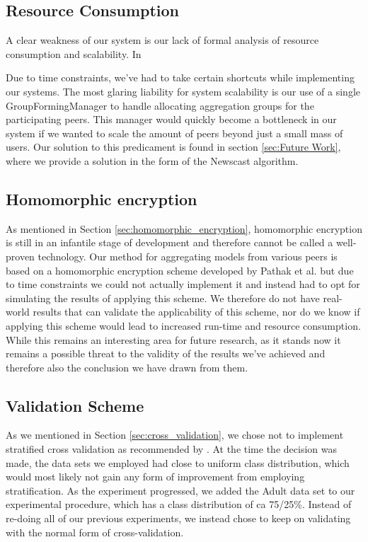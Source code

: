 \subsection{Resource Consumption}
A clear weakness of our system is our lack of formal analysis of resource consumption and scalability. In 

Due to time constraints, we've had to take certain shortcuts while implementing our systems. The most glaring liability for system scalability is our use of a single GroupFormingManager to handle allocating aggregation groups for the participating peers. This manager would quickly become a bottleneck in our system if we wanted to scale the amount of peers beyond just a small mass of users. Our solution to this predicament is found in section \ref{sec:Future Work}, where we provide a solution in the form of the Newscast algorithm. 

\subsection{Homomorphic encryption}
As mentioned in Section \ref{sec:homomorphic_encryption}, homomorphic encryption is still in an infantile stage of development and therefore cannot be called a well-proven technology. Our method for aggregating models from various peers is based on a homomorphic encryption scheme developed by Pathak et al. but due to time constraints we could not actually implement it and instead had to opt for simulating the results of applying this scheme. We therefore do not have real-world results that can validate the applicability of this scheme, nor do we know if applying this scheme would lead to increased run-time and resource consumption. While this remains an interesting area for future research, as it stands now it remains a possible threat to the validity of the results we've achieved and therefore also the conclusion we have drawn from them.  

\subsection{Validation Scheme}
As we mentioned in Section \ref{sec:cross_validation}, we chose not to implement stratified cross validation as recommended by \cite{kohavi1995crossvalidation}. At the time the decision was made, the data sets we employed had close to uniform class distribution, which would most likely not gain any form of improvement from employing stratification. As the experiment progressed, we added the Adult data set to our experimental procedure, which has a class distribution of ca 75/25\%. Instead of re-doing all of our previous experiments, we instead chose to keep on validating with the normal form of cross-validation. 

